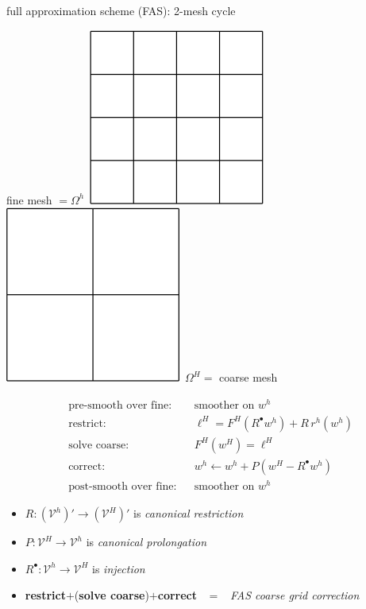 \documentclass[svgnames,
               hyperref={colorlinks,citecolor=DeepPink4,linkcolor=FireBrick,urlcolor=Maroon},
               usepdftitle=false]  %
               {beamer}
\newcommand{\iR}{R^{\bullet}}
\begin{document}
\begin{frame}{full approximation scheme (FAS): 2-mesh cycle}

\begin{center}
fine mesh $=\Omega^h$\, \includegraphics[height=0.14\textheight]{../talk-oxford/images/fine-grid.png} \hspace{15mm} \includegraphics[height=0.14\textheight]{../talk-oxford/images/coarse-grid.png} \,$\Omega^H=$ coarse mesh
\end{center}

\begin{align*}
&\text{pre-smooth over fine:} & & \text{smoother on } w^h \\
&\text{restrict:}                   & &\ell^H = F^H(\iR w^h) + R\, r^h(w^h) \\
&\text{solve coarse:}                      & &F^H(w^H) = \ell^H \\
&\text{correct:}                    & &w^h \leftarrow w^h + P(w^H - \iR w^h) \\
&\text{post-smooth over fine:} & & \text{smoother on } w^h
\end{align*}

\bigskip
{\small
\begin{itemize}
\item $R: (\mathcal{V}^h)' \to (\mathcal{V}^H)'$ is \emph{canonical restriction}
\item $P: \mathcal{V}^H \to \mathcal{V}^h$ is \emph{canonical prolongation}
\item $\iR: \mathcal{V}^h \to \mathcal{V}^H$ is \emph{injection}
\item \textbf{restrict}$+$(\textbf{solve coarse})$+$\textbf{correct} \, $=$ \, \emph{FAS coarse grid correction}
\end{itemize}
}
\end{frame}
\end{document}

